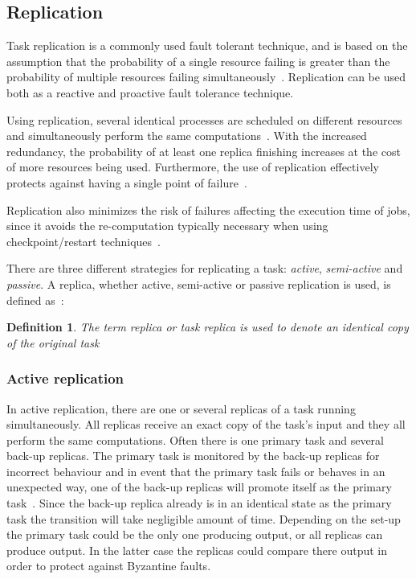 \documentclass{cslthse-msc}
\newtheorem{definition}{Definition}[chapter]
\begin{document}
\subsection{Replication} \label{subsec:background_replication}
Task replication is a commonly used fault tolerant technique, and is based on the assumption that the probability of a single resource failing is greater than the probability of multiple resources failing simultaneously~\cite{faultToleranceGrid}. Replication can be used both as a reactive and proactive fault tolerance technique.

Using replication, several identical processes are scheduled on different resources and simultaneously perform the same computations~\cite{relGridSystems}. With the increased redundancy, the probability of at least one replica finishing increases at the cost of more resources being used. Furthermore, the use of replication effectively protects against having a single point of failure~\cite{faultToleranceGrid}.

Replication also minimizes the risk of failures affecting the execution time of jobs, since it avoids the re-computation typically necessary when using checkpoint/restart techniques~\cite{designFaultTolerantSched}.

There are three different strategies for replicating a task: \emph{active}, \emph{semi-active} and \emph{passive}. A replica, whether active, semi-active or passive replication is used, is defined as~\cite{effTaskReplMobGrid}:
\begin{definition} \label{def:replica}
The term replica or task replica is used to denote an identical copy of the original task
\end{definition}

\subsubsection{Active replication} \label{subsec:active_replication}
In active replication, there are one or several replicas of a task running simultaneously. All replicas receive an exact copy of the task's input and they all perform the same computations. Often there is one primary task and several back-up replicas. The primary task is monitored by the back-up replicas for incorrect behaviour and in event that the primary task fails or behaves in an unexpected way, one of the back-up replicas will promote itself as the primary task~\cite{surveyFaultParallel}. Since the back-up replica already is in an identical state as the primary task the transition will take negligible amount of time. Depending on the set-up the primary task could be the only one producing output, or all replicas can produce output. In the latter case the replicas could compare there output in order to protect against Byzantine faults.
\end{document}
